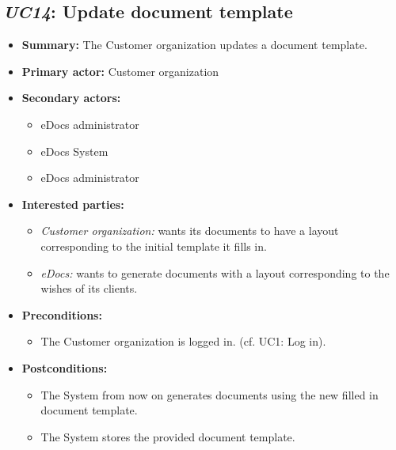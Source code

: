 \documentclass[a4paper,10pt]{article}
\begin{document}
\subsection{\emph{UC14}: Update document template}
\begin{itemize}
	\item \textbf{Summary:} The Customer organization updates a document template.
    \item \textbf{Primary actor:} Customer organization
    \item \textbf{Secondary actors:} 
    	\begin{itemize}
        	\item eDocs administrator
        	\item eDocs System
        	\item eDocs administrator
        \end{itemize}
    \item \textbf{Interested parties:} 
        \begin{itemize}
            \item \textit{Customer organization:} wants its documents to have a layout corresponding to the initial template it fills in.
            \item \textit{eDocs:} wants to generate documents with a layout corresponding to the wishes of its clients.
        \end{itemize}

    \item \textbf{Preconditions:}
        \begin{itemize}
            \item The Customer organization is logged in. (cf. UC1: Log in).
        \end{itemize}

    \item \textbf{Postconditions:}
        \begin{itemize}
            \item The System from now on generates documents using the new filled in document template.
            \item The System stores the provided document template.
        \end{itemize}
        

\end{itemize}
\end{document}
